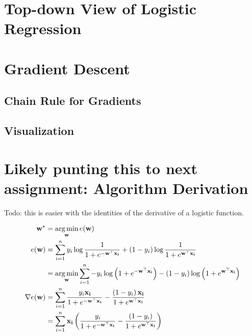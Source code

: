 \documentclass[assignment03_Solutions]{subfiles}
\begin{document}
\section{Top-down View of Logistic Regression}


\section{Gradient Descent}

\subsection{Chain Rule for Gradients}

\subsection{Visualization}

\section{Likely punting this to next assignment: Algorithm Derivation}

Todo: this is easier with the identities of the derivative of a logistic function.

\begin{align}
\mathbf{w^\star} &= \operatorname*{arg\,min}_{\mathbf{w}} e(\mathbf{w}) \\
e(\mathbf{w}) &= \sum_{i=1}^n y_i \log \frac{1}{1 + e^{-\mathbf{w}^\top \mathbf{x_i}}} +  (1-y_i) \log \frac{1}{1 + e^{\mathbf{w}^\top \mathbf{x_i}}} \\
&= \operatorname*{arg\,min}_{\mathbf{w}} \sum_{i=1}^n -y_i \log \left ( 1 + e^{-\mathbf{w}^\top \mathbf{x_i}} \right) -  (1-y_i) \log \left ( 1 + e^{\mathbf{w}^\top \mathbf{x_i}} \right) \\
\nabla e(\mathbf{w}) &= \sum_{i=1}^n \frac{y_i \mathbf{x_i}}{1 + e^{-\mathbf{w}^\top \mathbf{x_i}}} - \frac{\left ( 1 - y_i \right) \mathbf{x_i}}{1 + e^{\mathbf{w}^\top \mathbf{x_i}} } \\
&= \sum_{i=1}^n \mathbf{x_i} \left ( \frac{y_i }{1 + e^{-\mathbf{w}^\top \mathbf{x_i}}} - \frac{\left ( 1 - y_i \right) }{1 + e^{\mathbf{w}^\top \mathbf{x_i}} } \right)
\end{align}
\end{document}
